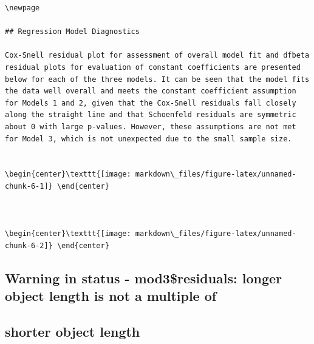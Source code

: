 \documentclass[
]{article}
\begin{document}
\begin{verbatim}
\newpage

## Regression Model Diagnostics

Cox-Snell residual plot for assessment of overall model fit and dfbeta residual plots for evaluation of constant coefficients are presented below for each of the three models. It can be seen that the model fits the data well overall and meets the constant coefficient assumption for Models 1 and 2, given that the Cox-Snell residuals fall closely along the straight line and that Schoenfeld residuals are symmetric about 0 with large p-values. However, these assumptions are not met for Model 3, which is not unexpected due to the small sample size. 


\begin{center}\texttt{[image: markdown\_files/figure-latex/unnamed-chunk-6-1]} \end{center}



\begin{center}\texttt{[image: markdown\_files/figure-latex/unnamed-chunk-6-2]} \end{center}
\end{verbatim}

\hypertarget{warning-in-status---mod3residuals-longer-object-length-is-not-a-multiple-of}{%
\subsection{Warning in status - mod3\$residuals: longer object length is
not a multiple
of}\label{warning-in-status---mod3residuals-longer-object-length-is-not-a-multiple-of}}

\hypertarget{shorter-object-length}{%
\subsection{shorter object length}\label{shorter-object-length}}
\end{document}

